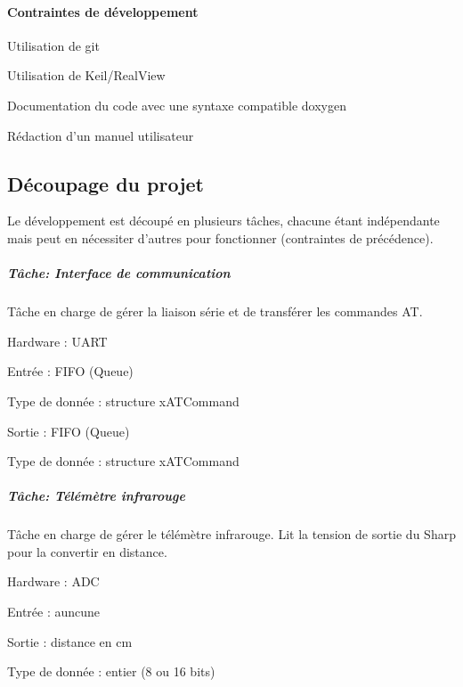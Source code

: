 \paragraph*{Contraintes de développement}


\begin{DoxyItemize}
\item Utilisation de git
\item Utilisation de Keil/\-Real\-View
\item Documentation du code avec une syntaxe compatible doxygen
\item Rédaction d'un manuel utilisateur
\end{DoxyItemize}

\subsection*{Découpage du projet}

Le développement est découpé en plusieurs tâches, chacune étant indépendante mais peut en nécessiter d'autres pour fonctionner (contraintes de précédence).

\subparagraph*{Tâche\-: Interface de communication}

Tâche en charge de gérer la liaison série et de transférer les commandes A\-T.


\begin{DoxyItemize}
\item Hardware \-: U\-A\-R\-T
\begin{DoxyItemize}
\item Entrée \-: F\-I\-F\-O (Queue)
\begin{DoxyItemize}
\item Type de donnée \-: structure x\-A\-T\-Command
\end{DoxyItemize}
\item Sortie \-: F\-I\-F\-O (Queue)
\begin{DoxyItemize}
\item Type de donnée \-: structure x\-A\-T\-Command
\end{DoxyItemize}
\end{DoxyItemize}
\end{DoxyItemize}

\subparagraph*{Tâche\-: Télémètre infrarouge}

Tâche en charge de gérer le télémètre infrarouge. Lit la tension de sortie du Sharp pour la convertir en distance.


\begin{DoxyItemize}
\item Hardware \-: A\-D\-C
\item Entrée \-: auncune
\item Sortie \-: distance en cm
\begin{DoxyItemize}
\item Type de donnée \-: entier (8 ou 16 bits)
\end{DoxyItemize}
\end{DoxyItemize}

